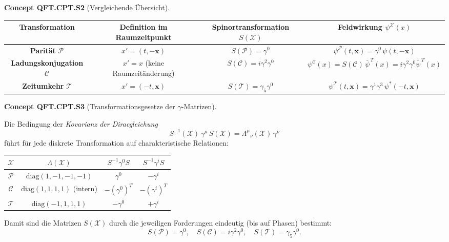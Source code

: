 \documentclass[10pt, letterpaper]{article}
\newcommand{\CustomHeading}[3]{%
  \par\medskip\noindent%
  \textbf{#1 #2} \textnormal{(#3)}.\enskip%
}
\newenvironment{CONC}[2]{\begin{unitbox}\CustomHeading{Concept}{#1}{#2}}{\end{unitbox}}
\begin{document}
\begin{CONC}{QFT.CPT.S2}{Vergleichende Übersicht}

\renewcommand{\arraystretch}{1.4}
\begin{center}
\begin{tabular}{|c|c|c|c|}
\hline
\textbf{Transformation} & \textbf{Definition im Raumzeitpunkt} & \textbf{Spinortransformation} $S(\mathcal X)$ & \textbf{Feldwirkung} $\psi^{\mathcal X}(x)$ \\ \hline
\textbf{Parität} $\mathcal P$ &
$x'=(t,-\mathbf x)$ &
$S(\mathcal P)=\gamma^0$ &
$\psi^{\mathcal P}(t,\mathbf x)=\gamma^0\,\psi(t,-\mathbf x)$ \\ \hline
\textbf{Ladungskonjugation} $\mathcal C$ &
$x'=x$ (keine Raumzeitänderung) &
$S(\mathcal C)=i\gamma^2\gamma^0$ &
$\psi^{\mathcal C}(x)=S(\mathcal C)\,\bar\psi^{\,T}(x)=i\gamma^2\gamma^0\bar\psi^{\,T}(x)$ \\ \hline
\textbf{Zeitumkehr} $\mathcal T$ &
$x'=(-t,\mathbf x)$ &
$S(\mathcal T)=\gamma_5\gamma^0$ &
$\psi^{\mathcal T}(t,\mathbf x)=\gamma^1\gamma^3\,\psi^*(-t,\mathbf x)$ \\ \hline
\end{tabular}
\end{center}

\end{CONC}

\begin{CONC}{QFT.CPT.S3}{Transformationsgesetze der $\gamma$-Matrizen}
Die Bedingung der \emph{Kovarianz der Diracgleichung}
\[
S^{-1}(\mathcal X)\,\gamma^\mu\,S(\mathcal X)=\Lambda^\mu{}_\nu(\mathcal X)\,\gamma^\nu
\]
führt für jede diskrete Transformation auf charakteristische Relationen:

\begin{center}
\renewcommand{\arraystretch}{1.4}
\begin{tabular}{|c|c|c|c|}
\hline
$\mathcal X$ & $\Lambda(\mathcal X)$ & $S^{-1}\gamma^0S$ & $S^{-1}\gamma^iS$ \\ \hline
$\mathcal P$ & $\mathrm{diag}(1,-1,-1,-1)$ & $\gamma^0$ & $-\gamma^i$ \\ \hline
$\mathcal C$ & $\mathrm{diag}(1,1,1,1)$ (intern) & $-(\gamma^0)^T$ & $-(\gamma^i)^T$ \\ \hline
$\mathcal T$ & $\mathrm{diag}(-1,1,1,1)$ & $-\gamma^0$ & $+\gamma^i$ \\ \hline
\end{tabular}
\end{center}

Damit sind die Matrizen $S(\mathcal X)$ durch die jeweiligen Forderungen eindeutig (bis auf Phasen) bestimmt:
\[
S(\mathcal P)=\gamma^0,\quad
S(\mathcal C)=i\gamma^2\gamma^0,\quad
S(\mathcal T)=\gamma_5\gamma^0.
\]
\end{CONC}
\end{document}
